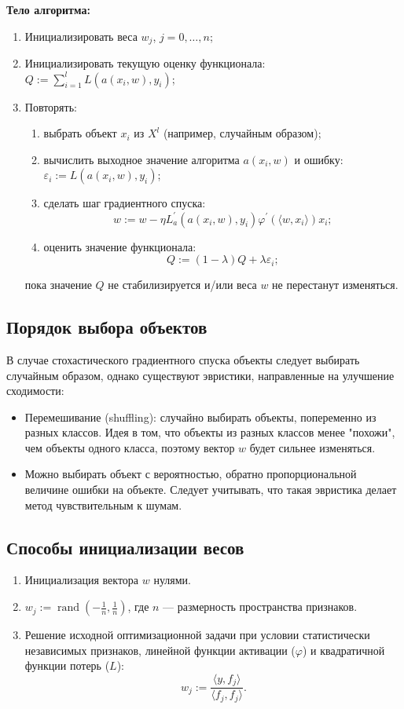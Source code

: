 \textbf{Тело алгоритма:}
\begin{enumerate}
    \item Инициализировать веса \( w_j \), \( j = 0, \dots, n \);
    \item Инициализировать текущую оценку функционала: \( Q := \sum_{i=1}^l L(a(x_i, w), y_i) \);
    \item Повторять:
    \begin{enumerate}
        \item выбрать объект \( x_i \) из \( X^l \) (например, случайным образом);
        \item вычислить выходное значение алгоритма \( a(x_i, w) \) и ошибку: \( \varepsilon_i := L(a(x_i, w), y_i) \);
        \item сделать шаг градиентного спуска:
        $$ w := w - \eta L_a^\prime (a(x_i, w), y_i) \varphi^\prime (\langle w, x_i \rangle)x_i; $$
        \item оценить значение функционала:
        $$ Q := (1 - \lambda)Q + \lambda\varepsilon_i; $$
    \end{enumerate}
    пока значение \( Q \) не стабилизируется и/или веса \( w \) не перестанут изменяться.
\end{enumerate}

\subsection*{Порядок выбора объектов}
В случае стохастического градиентного спуска объекты следует выбирать случайным образом, однако существуют эвристики, направленные на улучшение сходимости:
\begin{itemize}
    \item Перемешивание (shuffling): случайно выбирать объекты, попеременно из разных классов. Идея в том, что объекты из разных классов менее "похожи", чем объекты одного класса, поэтому вектор \( w \) будет сильнее изменяться.
    \item Можно выбирать объект с вероятностью, обратно пропорциональной величине ошибки на объекте. Следует учитывать, что такая эвристика делает метод чувствительным к шумам.
\end{itemize}

\subsection*{Способы инициализации весов}
\begin{enumerate}
    \item Инициализация вектора \( w \) нулями.
    \item \( w_j := \operatorname{rand}\left(-\frac{1}{n}, \frac{1}{n}\right) \), где \( n \) — размерность пространства признаков.
    \item Решение исходной оптимизационной задачи при условии статистически независимых признаков, линейной функции активации (\( \varphi \)) и квадратичной функции потерь (\( L \)):
    $$ w_j := \frac{\langle y, f_j \rangle}{\langle f_j, f_j \rangle}. $$
\end{enumerate}

